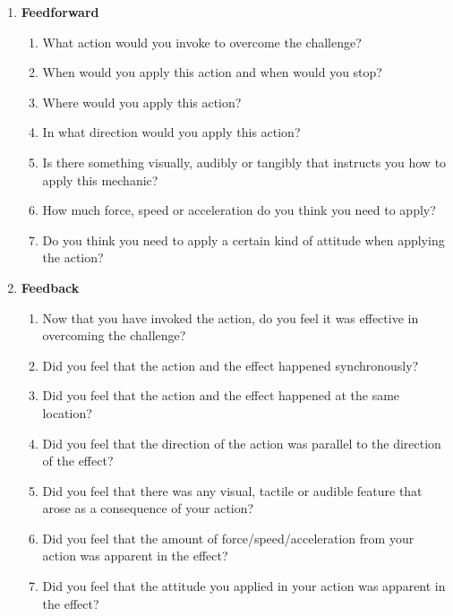 \begin{enumerate}
  \item \textbf{Feedforward}
  \begin{enumerate}
    \item What action would you invoke to overcome the challenge?
    \item When would you apply this action and when would you stop?
    \item Where would you apply this action?
    \item In what direction would you apply this action?
    \item Is there something visually, audibly or tangibly that instructs you how to apply this mechanic?
    \item How much force, speed or acceleration do you think you need to apply?
    \item Do you think you need to apply a certain kind of attitude when applying the action?
  \end{enumerate}
  \item \textbf{Feedback}
  \begin{enumerate}
    \item Now that you have invoked the action, do you feel it was effective in overcoming the challenge?
    \item Did you feel that the action and the effect happened synchronously?
    \item Did you feel that the action and the effect happened at the same location?
    \item Did you feel that the direction of the action was parallel to the direction of the effect?
    \item Did you feel that there was any visual, tactile or audible feature that arose as a consequence of your action?
    \item Did you feel that the amount of force/speed/acceleration from your action was apparent in the effect?
    \item Did you feel that the attitude you applied in your action was apparent in the effect?
  \end{enumerate}
\end{enumerate}

